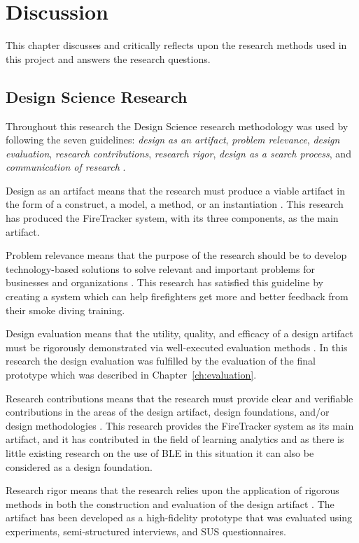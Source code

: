 \documentclass[../Main/thesis.tex]{subfiles}
\begin{document}
\chapter{Discussion}
\label{ch:discussion}
This chapter discusses and critically reflects upon the research methods used in this project and answers the research questions.

\section{Design Science Research}
Throughout this research the Design Science research methodology was used by following the seven guidelines: \textit{design as an artifact}, \textit{problem relevance}, \textit{design evaluation}, \textit{research contributions}, \textit{research rigor}, \textit{design as a search process}, and \textit{communication of research} \citep{hevner2004design}.

Design as an artifact means that the research must produce a viable artifact in the form of a construct, a model, a method, or an instantiation \citep{hevner2004design}.
This research has produced the FireTracker system, with its three components, as the main artifact.

Problem relevance means that the purpose of the research should be to develop technology-based solutions to solve relevant and important problems for businesses and organizations \citep{hevner2004design}.
This research has satisfied this guideline by creating a system which can help firefighters get more and better feedback from their smoke diving training.

Design evaluation means that the utility, quality, and efficacy of a design artifact must be rigorously demonstrated via well-executed evaluation methods \citep{hevner2004design}.
In this research the design evaluation was fulfilled by the evaluation of the final prototype which was described in Chapter~\ref{ch:evaluation}.

Research contributions means that the research must provide clear and verifiable contributions in the areas of the design artifact, design foundations, and/or design methodologies \citep{hevner2004design}.
This research provides the FireTracker system as its main artifact, and it has contributed in the field of learning analytics and as there is little existing research on the use of BLE in this situation it can also be considered as a design foundation.

Research rigor means that the research relies upon the application of rigorous methods in both the construction and evaluation of the design artifact \citep{hevner2004design}.
The artifact has been developed as a high-fidelity prototype that was evaluated using experiments, semi-structured interviews, and SUS questionnaires.
\end{document}
